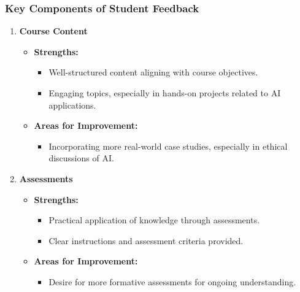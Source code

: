 \documentclass[aspectratio=169]{beamer}
\begin{document}
\begin{frame}[fragile]
    \frametitle{Key Components of Student Feedback}
    \begin{enumerate}
        \item \textbf{Course Content}
            \begin{itemize}
                \item \textbf{Strengths:}
                \begin{itemize}
                    \item Well-structured content aligning with course objectives.
                    \item Engaging topics, especially in hands-on projects related to AI applications.
                \end{itemize}
                \item \textbf{Areas for Improvement:}
                \begin{itemize}
                    \item Incorporating more real-world case studies, especially in ethical discussions of AI.
                \end{itemize}
            \end{itemize}
        
        \item \textbf{Assessments}
            \begin{itemize}
                \item \textbf{Strengths:}
                \begin{itemize}
                    \item Practical application of knowledge through assessments.
                    \item Clear instructions and assessment criteria provided.
                \end{itemize}
                \item \textbf{Areas for Improvement:}
                \begin{itemize}
                    \item Desire for more formative assessments for ongoing understanding.
                \end{itemize}
            \end{itemize}
        

\end{enumerate}
\end{frame}
\end{document}
